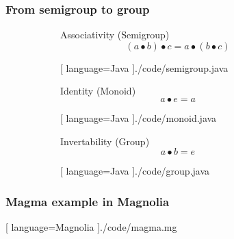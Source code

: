 \begin{frame}
  \frametitle{From semigroup to group}
  \begin{figure}[H]
    \begin{subfigure}[h]{0.45\textwidth}
      Associativity (Semigroup)
      \begin{equation}
        (a \bullet b) \bullet c = a \bullet (b \bullet c)
      \end{equation}
    \end{subfigure}
    \hfill
    \begin{subfigure}[h]{0.45\textwidth}
  \begin{center}
    
    [ language=Java
    ]{./code/semigroup.java}
  \end{center}
\end{subfigure}
  \end{figure}
      \pause
  \begin{figure}[H]
    \begin{subfigure}[h]{0.45\textwidth}
      Identity (Monoid)
      \begin{equation}
        a \bullet e = a
      \end{equation}
    \end{subfigure}
    \hfill
    \begin{subfigure}[h]{0.45\textwidth}
  \begin{center}
    
    [ language=Java
    ]{./code/monoid.java}
  \end{center}
\end{subfigure}
  \end{figure}
      \pause
  \begin{figure}[H]
    \begin{subfigure}[h]{0.45\textwidth}
      Invertability (Group)
      \begin{equation}
        a \bullet b = e
      \end{equation}
    \end{subfigure}
    \hfill
    \begin{subfigure}[h]{0.45\textwidth}
  \begin{center}
    
    [ language=Java
    ]{./code/group.java}
  \end{center}
\end{subfigure}
  \end{figure}
\end{frame}

\showlogo

\begin{frame}
  \frametitle{Magma example in Magnolia}
  \begin{center}
    
    [ language=Magnolia
    ]{./code/magma.mg}
  \end{center}
\end{frame}

